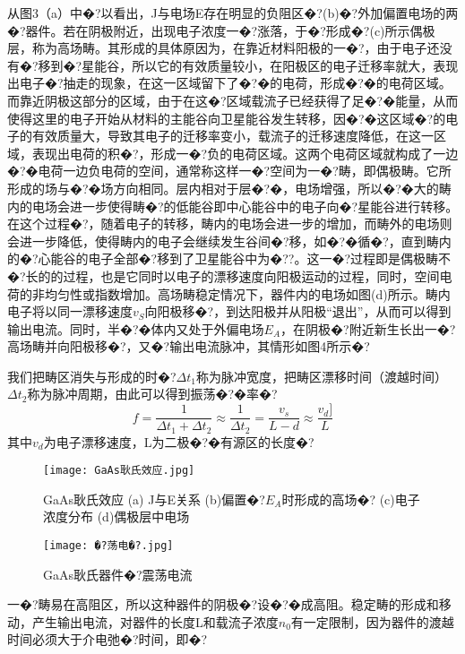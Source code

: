 \documentclass{zjureport}
\begin{document}
 从图3（a）中�?以看出，J与电场E存在明显的负阻区�?(b)�?外加偏置电场的两�?器件。若在阴极附近，出现电子浓度一�?涨落，于�?形成�?(c)所示偶极层，称为高场畴。其形成的具体原因为，在靠近材料阳极的一�?，由于电子还没有�?移到�?星能谷，所以它的有效质量较小，在阳极区的电子迁移率就大，表现出电子�?抽走的现象，在这一区域留下了�?�的电荷，形成�?�的电荷区域。而靠近阴极这部分的区域，由于在这�?区域载流子已经获得了足�?�能量，从而使得这里的电子开始从材料的主能谷向卫星能谷发生转移，因�?�这区域�?的电子的有效质量大，导致其电子的迁移率变小，载流子的迁移速度降低，在这一区域，表现出电荷的积�?，形成一�?负的电荷区域。这两个电荷区域就构成了一边�?�电荷一边负电荷的空间，通常称这样一�?空间为一�?畴，即偶极畴。它所形成的场与�?�场方向相同。层内相对于层�?�，电场增强，所以�?�大的畴内的电场会进一步使得畴�?的低能谷即中心能谷中的电子向�?星能谷进行转移。在这个过程�?，随着电子的转移，畴内的电场会进一步的增加，而畴外的电场则会进一步降低，使得畴内的电子会继续发生谷间�?移，如�?�循�?，直到畴内的�?心能谷的电子全部�?移到了卫星能谷中为�??。这一�?过程即是偶极畴不�?长的的过程，也是它同时以电子的漂移速度向阳极运动的过程，同时，空间电荷的非均匀性或指数增加。高场畴稳定情况下，器件内的电场如图(d)所示。畴内电子将以同一漂移速度$v_{S}$向阳极移�?，到达阳极并从阳极“退出”，从而可以得到输出电流。同时，半�?�体内又处于外偏电场$E_{A}$，在阴极�?附近新生长出一�?高场畴并向阳极移�?，又�?输出电流脉冲，其情形如图4所示�?
 
 我们把畴区消失与形成的时�?$\Delta t_{1}$称为脉冲宽度，把畴区漂移时间（渡越时间）$\Delta t_{2}$称为脉冲周期，由此可以得到振荡�?�率�?
 \begin{equation}
 	f=\frac{1}{\Delta t_{1}+\Delta t_{2}}\approx\frac{1}{\Delta t_{2}}=\frac{v_{s}}{L-d} \approx \frac{v_{d}]}{L}
 \end{equation}
 其中$v_{d}$为电子漂移速度，L为二极�?�有源区的长度�?
  \begin{figure}[htbp]
 	\centering
 	\texttt{[image: GaAs耿氏效应.jpg]}
 	\caption{GaAs耿氏效应 (a) J与E关系 (b)偏置�?$E_{A}$时形成的高场�? (c)电子浓度分布 (d)偶极层中电场}
 \end{figure}
 
 \begin{figure}[htbp]
 	\centering
 	\texttt{[image: �?荡电�?.jpg]}
 	\caption{GaAs耿氏器件�?震荡电流}
 \end{figure}
 
 一�?畴易在高阻区，所以这种器件的阴极�?设�?�成高阻。稳定畴的形成和移动，产生输出电流，对器件的长度L和载流子浓度$n_{0}$有一定限制，因为器件的渡越时间必须大于介电弛�?时间，即�?
 
\end{document}
